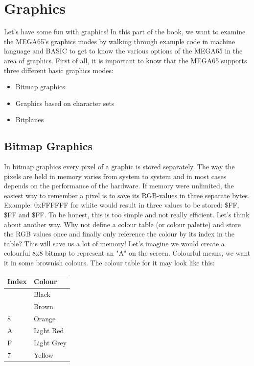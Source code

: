 
\newcommand{\blkb}{\cellcolor[rgb]{0,0,0}\textcolor{white} 0 }
\newcommand{\bwn}{\cellcolor[rgb]{.26,.22,0}\textcolor{white} 9 }
\newcommand{\ora}{\cellcolor[rgb]{.44,.31,.15}8 }
\newcommand{\red}{\cellcolor[rgb]{.6,.4,.35}A }
\newcommand{\lgr}{\cellcolor[rgb]{.58,.58,.58}F }
\newcommand{\yel}{\cellcolor[rgb]{.72,.78,.44}7 }

\newcommand{\redb}{\cellcolor[rgb]{.6,.4,.35} 1 }

\chapter{Graphics}
\label{cha:graphics}

Let's have some fun with graphics!
In this part of the book, we want to examine the MEGA65's graphics modes by walking through example code in machine language and BASIC to get to know the various options of the MEGA65 in the area of graphics. First of all, it is important to know that the MEGA65 supports three different basic graphics modes:

\begin{itemize}
	\item Bitmap graphics
	\item Graphics based on character sets
	\item Bitplanes
\end{itemize}


\section*{Bitmap Graphics}

In bitmap graphics every pixel of a graphic is stored separately. The way the pixels are held in memory varies from system to system and in most cases depends on the performance of the hardware. If memory were unlimited, the easiest way to remember a pixel is to save its RGB-values in three separate bytes. Example: 0xFFFFFF for white would result in three values to be stored: \$FF, \$FF and \$FF. To be honest, this is too simple and not really efficient. Let’s think about another way. Why not define a colour table (or colour palette) and store the RGB values once and finally only reference the colour by its index in the table? This will save us a lot of memory! Let's imagine we would create a colourful 8x8 bitmap to represent an "A" on the screen. Colourful means, we want it in some brownish colours. The colour table for it may look like this:

\begin{center}
\begin{tabular}{|l|l|}
\hline
	Index & Colour \\
\hline
	\blkb & Black \\
	\bwn & Brown \\
	\ora & Orange \\
	\red & Light Red \\
	\lgr & Light Grey \\
	\yel & Yellow \\
\hline
\end{tabular}
\end{center}

